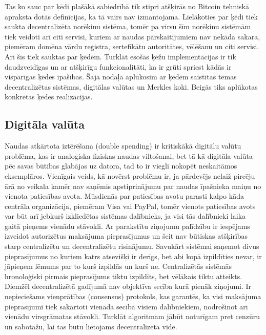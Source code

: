 Tas ko sauc par ķēdi plašākā sabiedrībā tik stipri atšķirās no Bitcoin tehniskā apraksta\cite{nakamoto08} dotās definīcijas, ka tā vairs nav izmantojama. 
Lielākoties par ķēdi tiek saukta decentralizēta norēķinu sistēma, tomēr pa virsu šīm norēķinu sistēmām tiek veidoti arī citi servisi, kuriem ar naudas pārskaitījumiem nav nekāda sakara, piemēram domēna vārdu reģistra, sertefikātu autoritātes, vēlēšanu un citi servisi.\cite{namecoin} Arī šīs tiek sauktas par ķēdēm.
Turklāt esošās ķēžu implementācijas ir tik daudzveidīgas un ar atšķirīgu funkcionalitāti, ka ir grūti spriest kādās ir vispārīgas ķēdes īpašības.
Šajā nodaļā aplūkosim ar ķēdēm saistītas tēmas \textemdash{} decentralizētas sistēmas, digitālas valūtas un Merkles koki. Beigās tiks aplūkotas konkrētas ķēdes realizācijas.

\subsection{Digitāla valūta}
Naudas atkārtota iztērēšana (double spending) ir kritiskākā digitālu valūtu problēma, kas ir analoģiska fiziskas naudas viltošanai, bet tā kā digitāla valūta pēc savas būtības glabājas uz datora, tad to ir viegli nokopēt neskaitāmos eksemplāros. Vienīgais veids, kā novērst problēmu ir, ja pārdevējs nelaiž pircēju ārā no veikala kamēr nav saņēmis apstiprinājumu par naudas īpašnieka maiņu no vienota patiesības avota.\cite{frankel96}
Mūsdienās par patiesības avotu parasti kalpo kāda centrāla organizācija, piemēram Visa vai PayPal, tomēr vienots patiesības avots var būt arī jebkurš izkliedētas sistēmas dalībnieks, ja visi tās dalībnieki laika gaitā pieņems vienādu stāvokli.
Ar parakstītu ziņojumu palīdzību ir iespējams izveidot autorizētus maksājuma pieprasījumus un šeit nav būtiskas atšķirības starp centralizētu un decentralizētu risinājumu. Savukārt sistēmai saņemot divus pieprasījumus no kuriem katrs atsevišķi ir derīgs, bet abi kopā izpildīties nevar, ir jāpieņem lēmums par to kurš izpildās un kurš ne.
Centralizētās sistēmās hronoloģiski pirmais pieprasījums tiktu izpildīts, bet vēlākais tiktu atteikts. Diemžēl decentralizētā gadījumā nav objektīva secība kurā pienāk ziņojumi. Ir nepieciešams vienprātības (consensus) protokols, kas garantēs, ka visi maksājuma pieprasījumi tiek sakārtoti vienādā secībā visiem dalībniekiem, nodrošinot arī vienādu virsgrāmatas stāvokli.
Turklāt algoritmam jābūt noturīgam pret cenzūru un sabotāžu, lai tas būtu lietojams decentralizētā vidē.


